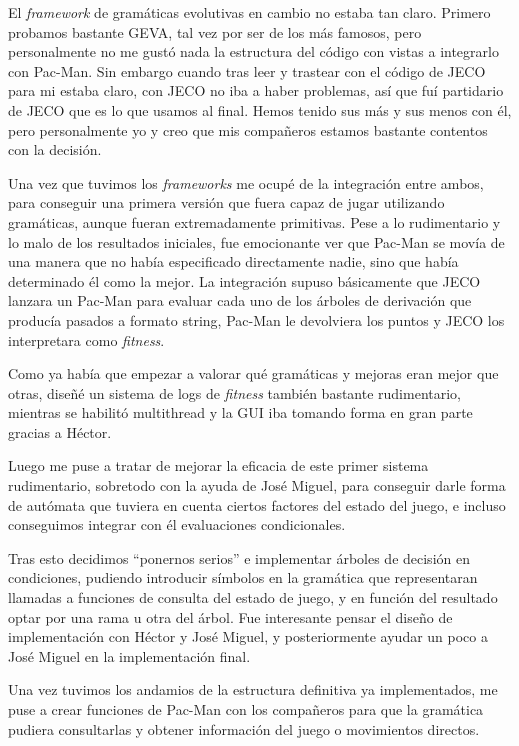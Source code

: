 El \textit{framework} de gramáticas evolutivas en cambio no estaba tan claro. Primero probamos bastante GEVA, tal vez por ser de los más famosos, pero personalmente no me gustó nada la estructura del código con vistas a integrarlo con Pac-Man. Sin embargo cuando tras leer y trastear con el código de JECO para mi estaba claro, con JECO no iba a haber problemas, así que fuí partidario de JECO que es lo que usamos al final. Hemos tenido sus más y sus menos con él, pero personalmente yo y creo que mis compañeros estamos bastante contentos con la decisión.

Una vez que tuvimos los \textit{frameworks} me ocupé de la integración entre ambos, para conseguir una primera versión que fuera capaz de jugar utilizando gramáticas, aunque fueran extremadamente primitivas. Pese a lo rudimentario y lo malo de los resultados iniciales, fue emocionante ver que Pac-Man se movía de una manera que no había especificado directamente nadie, sino que había determinado él como la mejor. La integración supuso básicamente que JECO lanzara un Pac-Man para evaluar cada uno de los árboles de derivación que producía pasados a formato string, Pac-Man le devolviera los puntos y JECO los interpretara como \textit{fitness}.

Como ya había que empezar a valorar qué gramáticas y mejoras eran mejor que otras, diseñé un sistema de logs de \textit{fitness} también bastante rudimentario, mientras se habilitó multithread y la GUI iba tomando forma en gran parte gracias a Héctor.

Luego me puse a tratar de mejorar la eficacia de este primer sistema rudimentario, sobretodo con la ayuda de José Miguel, para conseguir darle forma de autómata que tuviera en cuenta ciertos factores del estado del juego, e incluso conseguimos integrar con él evaluaciones condicionales.

Tras esto decidimos ``ponernos serios'' e implementar árboles de decisión en condiciones, pudiendo introducir símbolos en la gramática que representaran llamadas a funciones de consulta del estado de juego, y en función del resultado optar por una rama u otra del árbol. Fue interesante pensar el diseño de implementación con Héctor y José Miguel, y posteriormente ayudar un poco a José Miguel en la implementación final.

Una vez tuvimos los andamios de la estructura definitiva ya implementados, me puse a crear funciones de Pac-Man con los compañeros para que la gramática pudiera consultarlas y obtener información del juego o movimientos directos.

